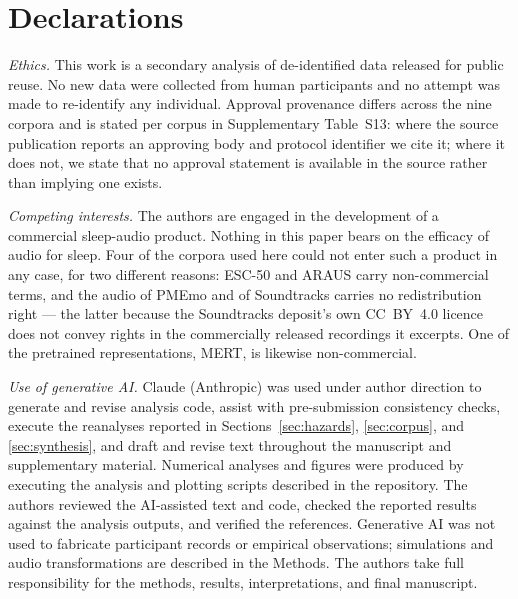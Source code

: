 \section{Declarations}
\label{sec:declarations}

\emph{Ethics.} This work is a secondary analysis of de-identified data
released for public reuse. No new data were collected from human participants
and no attempt was made to re-identify any individual. Approval provenance
differs across the nine corpora and is stated per corpus in Supplementary
Table~S13: where the source publication reports an approving body and protocol
identifier we cite it; where it does not, we state that no approval statement
is available in the source rather than implying one exists.

\emph{Competing interests.} The authors are engaged in the development of a
commercial sleep-audio product. Nothing in this paper bears on the efficacy of
audio for sleep. Four of the corpora used here could not enter such a product
in any case, for two different reasons: ESC-50 and ARAUS carry non-commercial
terms, and the audio of PMEmo and of Soundtracks carries no redistribution
right --- the latter because the Soundtracks deposit's own CC~BY~4.0 licence
does not convey rights in the commercially released recordings it excerpts. One
of the pretrained representations, MERT, is likewise non-commercial.

\emph{Use of generative AI.} Claude (Anthropic) was used under author direction
to generate and revise analysis code, assist with pre-submission consistency
checks, execute the reanalyses reported in
Sections~\ref{sec:hazards}, \ref{sec:corpus}, and \ref{sec:synthesis}, and
draft and revise text throughout the manuscript and supplementary material.
Numerical analyses and figures were produced by executing the analysis and
plotting scripts described in the repository. The authors reviewed the
AI-assisted text and code, checked the reported results against the analysis
outputs, and verified the references. Generative AI was not used to fabricate
participant records or empirical observations; simulations and audio
transformations are described in the Methods. The authors take full
responsibility for the methods, results, interpretations, and final manuscript.

